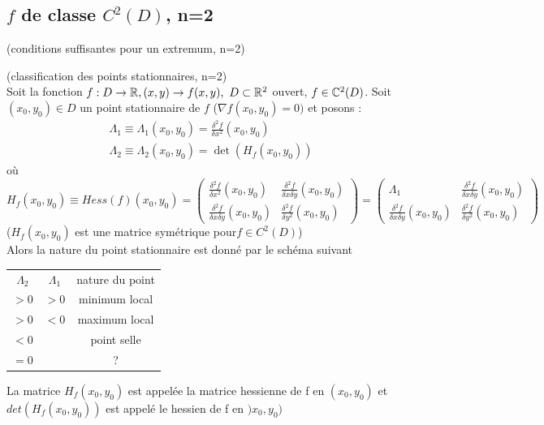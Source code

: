 \documentclass[12pt,a4paper]{article}
\begin{document}
\subsection{$f$ de classe $C^2(D)$, n=2}
(conditions suffisantes pour un extremum, n=2)
\begin{boite}
	 (classification des points stationnaires, n=2)\\
	Soit la fonction $f : D\to \mathbb{R}, (x,y) \to f(x,y),\ D\subset \mathbb{R}^2$ ouvert, $f\in \mathbb{C}^2(D)$. Soit $(x_0,y_0) \in D$ un point stationnaire de $f$ ($\nabla f(x_0,y_0) = 0)$ et posons :
	\begin{align*}
		\Lambda_1 \equiv \Lambda_1(x_0,y_0) = \frac{\delta^2 f}{\delta x^2}(x_0,y_0)\\
		\Lambda_2 \equiv \Lambda_2(x_0,y_0) = \det(H_f(x_0,y_0))
	\end{align*}
	où $H_f(x_0,y_0) \equiv Hess(f)(x_0,y_0) = \begin{pmatrix}
			\frac{\delta^2 f}{\delta x^2 }(x_0,y_0) & \frac{\delta^2 f}{\delta x \delta y}(x_0,y_0)\\
			\frac{\delta^2 f}{\delta x\delta y}(x_0,y_0) & \frac{\delta^2 f}{\delta y^2} (x_0,y_0)
	\end{pmatrix} = \begin{pmatrix}
			\Lambda_1 & \frac{\delta^2 f}{\delta x \delta y}(x_0,y_0)\\
			\frac{\delta^2 f}{\delta x\delta y}(x_0,y_0) & \frac{\delta^2 f}{\delta y^2} (x_0,y_0)
	\end{pmatrix}$
	($H_f(x_0,y_0)$ est une matrice symétrique pour$f\in C^2(D)$)\\
	Alors la nature du point stationnaire est donné par le schéma suivant
	\begin{boite}[0.4]
		\begin{tabular}{ccc}
			$\Lambda_2$ & $\Lambda_1$ & nature du point\\
			$> 0$ & $>0$ & minimum local\\
			$> 0$ & $<0$ & maximum local\\
			$< 0$ & & point selle\\
			$=0$ & & ?
		\end{tabular}
	\end{boite}
\end{boite}

 La matrice $H_f(x_0,y_0)$ est appelée la matrice hessienne de f en $(x_0,y_0)$ et $det(H_f(x_0,y_0))$ est appelé le hessien de f en $)x_0,y_0)$
\end{document}
